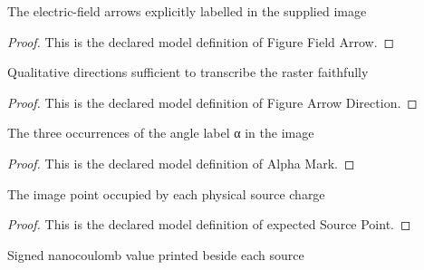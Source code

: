 \begin{definition}
  \label{def:physics:phyx-mini-0994:phyxminiproblems-problemphyxmini0994-figurefieldarrow}
  The electric-field arrows explicitly labelled in the supplied image
\end{definition}
\begin{proof}
  This is the declared model definition of Figure Field Arrow.
\end{proof}
\begin{definition}
  \label{def:physics:phyx-mini-0994:phyxminiproblems-problemphyxmini0994-figurearrowdirection}
  Qualitative directions sufficient to transcribe the raster faithfully
\end{definition}
\begin{proof}
  This is the declared model definition of Figure Arrow Direction.
\end{proof}
\begin{definition}
  \label{def:physics:phyx-mini-0994:phyxminiproblems-problemphyxmini0994-alphamark}
  The three occurrences of the angle label α in the image
\end{definition}
\begin{proof}
  This is the declared model definition of Alpha Mark.
\end{proof}
\begin{definition}
  \label{def:physics:phyx-mini-0994:phyxminiproblems-problemphyxmini0994-expectedsourcepoint}
  The image point occupied by each physical source charge
\end{definition}
\begin{proof}
  This is the declared model definition of expected Source Point.
\end{proof}
\begin{definition}
  \label{def:physics:phyx-mini-0994:phyxminiproblems-problemphyxmini0994-expectedchargeinnanocoulombs}
  Signed nanocoulomb value printed beside each source
\end{definition}
